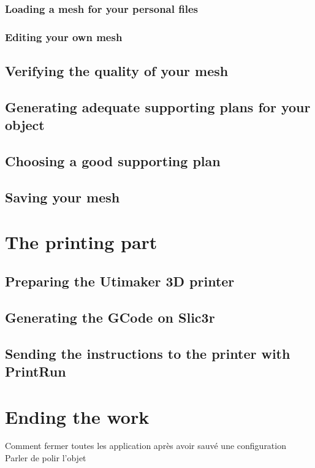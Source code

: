\documentclass{article}
\begin{document}
\subsubsection{Loading a mesh for your personal files}

\subsubsection{Editing your own mesh}

\subsection{Verifying the quality of your mesh}

\subsection{Generating adequate supporting plans for your object}

\subsection{Choosing a good supporting plan}

\subsection{Saving your mesh}

\newpage

\section{The printing part}

\subsection{Preparing the Utimaker 3D printer}

\subsection{Generating the GCode on Slic3r}

\subsection{Sending the instructions to the printer with PrintRun}

\newpage

\section{Ending the work}

Comment fermer toutes les application après avoir sauvé une configuration \\
Parler de polir l'objet \\
\end{document}
